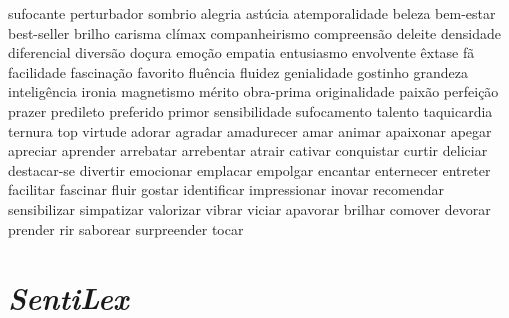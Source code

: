 \documentclass[ruledheader]{abnt_UFF}
\begin{document}
sufocante perturbador sombrio alegria ast\'{u}cia atemporalidade beleza bem-estar best-seller brilho carisma cl\'{i}max companheirismo compreens\~ao deleite densidade diferencial divers\~ao do\c{c}ura emo\c{c}\~ao empatia entusiasmo envolvente \^{e}xtase f\~a facilidade fascina\c{c}\~ao favorito flu\^{e}ncia fluidez genialidade gostinho grandeza intelig\^{e}ncia ironia magnetismo m\'{e}rito obra-prima originalidade paix\~ao perfei\c{c}\~ao prazer predileto preferido primor sensibilidade sufocamento talento taquicardia ternura top virtude adorar agradar amadurecer amar animar apaixonar apegar apreciar aprender arrebatar arrebentar atrair cativar conquistar curtir deliciar destacar-se divertir emocionar emplacar empolgar encantar enternecer entreter facilitar fascinar fluir gostar identificar impressionar inovar recomendar sensibilizar simpatizar valorizar vibrar viciar apavorar brilhar comover devorar prender rir saborear surpreender tocar

\section{\textit{SentiLex}}
\end{document}
